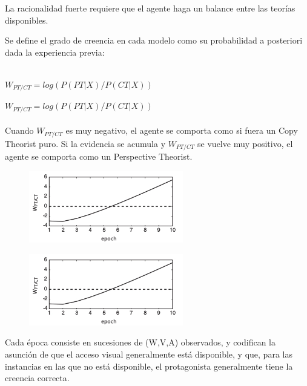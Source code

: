\documentclass{beamer}
\begin{document}
\begin{frame}
La racionalidad fuerte requiere que el agente haga un balance entre las teorías disponibles.

Se define el grado de creencia en cada modelo como su probabilidad a posteriori dada la experiencia previa:

~\\
{\Large
$W_{PT/CT} = log(P(PT|X)/P(CT|X))$
}

\end{frame}


\begin{frame}

{\Large
$W_{PT/CT} = log(P(PT|X)/P(CT|X))$
\\
}
~\\

Cuando $W_{PT/CT}$ es muy negativo, el agente se comporta como si fuera un Copy Theorist puro. Si la evidencia se acumula y $W_{PT/CT}$ se vuelve muy positivo, el agente se comporta como un Perspective Theorist.


\end{frame}


\begin{frame}

\begin{figure}
	\includegraphics[width=0.6\textwidth]{imagenes/log_posterior.jpg}
\end{figure}

\end{frame}

\begin{frame}

\begin{figure}
	\includegraphics[width=0.6\textwidth]{imagenes/log_posterior.jpg}
\end{figure}

Cada época consiste en sucesiones de (W,V,A) observados, y codifican la asunción de que el acceso visual generalmente está disponible, y que, para las instancias en las que no está disponible, el protagonista generalmente tiene la creencia correcta.

\end{frame}
\end{document}
